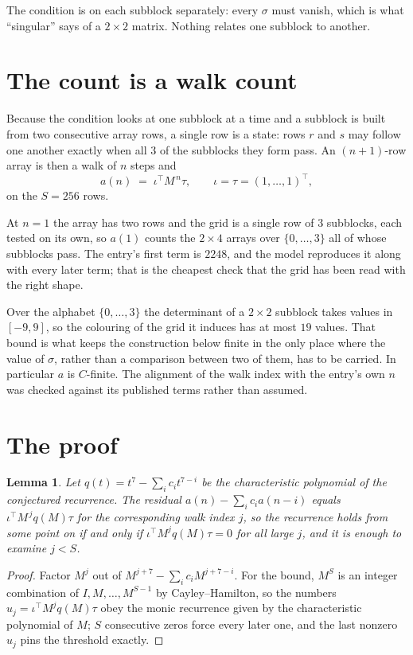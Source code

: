 \documentclass[11pt,a4paper]{article}
\theoremstyle{plain}
\newtheorem{lemma}[theorem]{Lemma}
\theoremstyle{definition}
\begin{document}
The condition is on each subblock separately: every $\sigma$ must vanish, which is what
``singular'' says of a $2\times2$ matrix. Nothing
relates one subblock to another.

\section{The count is a walk count}

Because the condition looks at one subblock at a time and a subblock is
built from two consecutive array rows, a single row is a state: rows $r$ and $s$ may follow one
another exactly when all $3$ of the subblocks they form pass. An $(n+1)$-row array is then a
walk of $n$ steps and
\[
a(n)\;=\;\iota^{\!\top}M^{\,n}\tau,\qquad\iota=\tau=(1,\dots,1)^{\!\top},
\]
on the $S=256$ rows.

At $n=1$ the array has two rows and the grid is a single row of $3$
subblocks, each tested on its own, so $a(1)$ counts the
$2\times4$ arrays over $\{0,\dots,3\}$ all of whose subblocks pass. The entry's
first term is $2248$, and the model reproduces it along with every later term; that is the
cheapest check that the grid has been read with the right shape.

Over the alphabet $\{0,\dots,3\}$ the determinant of a $2\times2$ subblock takes values in
$[-9,9]$, so the colouring of the grid it induces has at most $19$ values.
That bound is what keeps the construction below finite in the only place where the value of
$\sigma$, rather than a comparison between two of them, has to be carried.
In particular $a$ is $C$-finite. The alignment of the walk index with the entry's own $n$ was
checked against its published terms rather than assumed.

\section{The proof}

\begin{lemma}\label{lem:crit}
Let $q(t)=t^{7}-\sum_i c_it^{7-i}$ be the characteristic polynomial of the
conjectured recurrence. The residual $a(n)-\sum_ic_ia(n-i)$ equals
$\iota^{\!\top}M^{\,j}q(M)\tau$ for the corresponding walk index $j$, so the recurrence
holds from some point on if and only if $\iota^{\!\top}M^{j}q(M)\tau=0$ for all large $j$,
and it is enough to examine $j<S$.
\end{lemma}

\begin{proof}
Factor $M^{j}$ out of $M^{j+7}-\sum_ic_iM^{j+7-i}$. For the bound, $M^{S}$
is an integer combination of $I,M,\dots,M^{S-1}$ by Cayley--Hamilton, so the numbers
$u_j=\iota^{\!\top}M^{j}q(M)\tau$ obey the monic recurrence given by the characteristic
polynomial of $M$; $S$ consecutive zeros force every later one, and the last nonzero $u_j$
pins the threshold exactly.
\end{proof}
\end{document}
